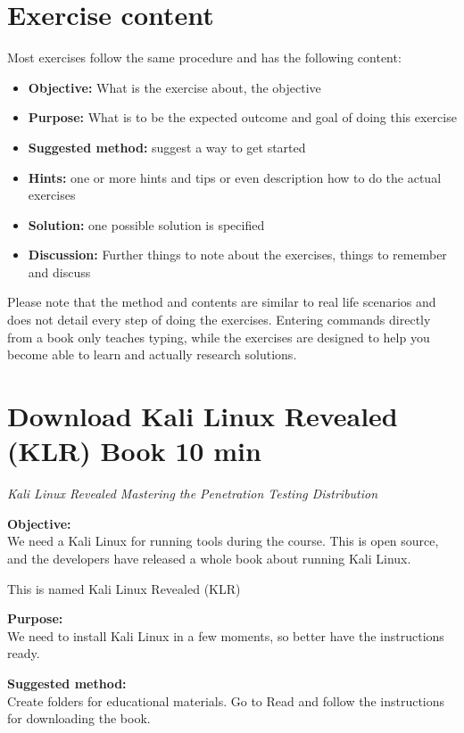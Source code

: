 \documentclass[a4paper,11pt,notitlepage]{report}
\begin{document}
\chapter*{\color{titlecolor}Exercise content}

Most exercises follow the same procedure and has the following content:
\begin{itemize}
\item {\bf Objective:} What is the exercise about, the objective
\item {\bf Purpose:} What is to be the expected outcome and goal of doing this exercise
\item {\bf Suggested method:} suggest a way to get started
\item {\bf Hints:} one or more hints and tips or even description how to
do the actual exercises
\item {\bf Solution:} one possible solution is specified
\item {\bf Discussion:} Further things to note about the exercises, things to remember and discuss
\end{itemize}

Please note that the method and contents are similar to real life scenarios and does not detail every step of doing the exercises. Entering commands directly from a book only teaches typing, while the exercises are designed to help you become able to learn and actually research solutions.


\chapter{Download Kali Linux Revealed (KLR) Book 10 min}
\label{ex:downloadKLR}



\emph{Kali Linux Revealed  Mastering the Penetration Testing Distribution}


{\bf Objective:}\\
We need a Kali Linux for running tools during the course. This is open source, and the developers have released a whole book about running Kali Linux.

This is named Kali Linux Revealed (KLR)

{\bf Purpose:}\\
We need to install Kali Linux in a few moments, so better have the instructions ready.

{\bf Suggested method:}\\
Create folders for educational materials. Go to 
Read and follow the instructions for downloading the book.
\end{document}
